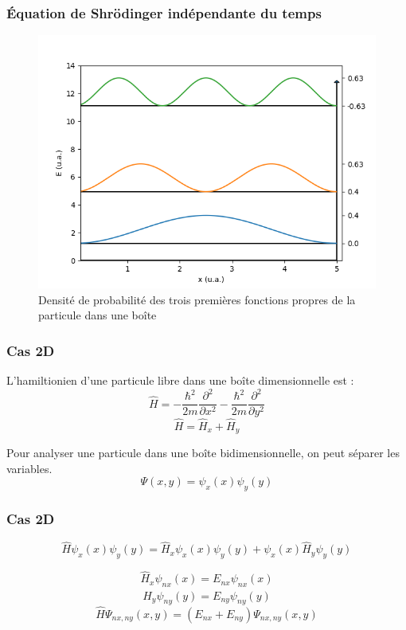 \documentclass[aspectratio=169]{beamer}
\begin{document}
\begin{frame}
\frametitle{Équation de Shrödinger indépendante du temps}
\begin{figure}[h]
\includegraphics[scale=0.5]{den_propre}
\caption{Densité de probabilité des trois premières fonctions propres de la particule dans une boîte}
\end{figure}

\end{frame}



\begin{frame}
\frametitle{Cas 2D}
L'hamiltionien d'une particule libre dans une boîte dimensionnelle est :
\begin{equation}
\hat{H}=-\frac{\hbar^2}{2m}\frac{\partial^2}{\partial x^2}-\frac{\hbar^2}{2m}\frac{\partial^2}{\partial y^2}
\end{equation}
\begin{equation}
\hat{H}=\hat{H}_x+\hat{H}_y
\end{equation}


Pour analyser une particule dans une boîte bidimensionnelle, on peut séparer les variables. 
\begin{equation}
\Psi(x,y)=\psi_x(x)\psi_y(y)
\end{equation}
\end{frame}


\begin{frame}
\frametitle{Cas 2D}
\begin{equation}
\hat{H}\psi_x(x)\psi_y(y)=\hat{H}_x\psi_x(x)\psi_y(y)+\psi_x(x)\hat{H}_y\psi_y(y)
\end{equation}

\begin{equation}
\hat{H}_x\psi_{nx}(x)=E_{nx}\psi_{nx}(x)
\end{equation}
\begin{equation}
\hat{H}_y\psi_{ny}(y)=E_{ny}\psi_{ny}(y)
\end{equation}
\begin{equation}
\hat{H}\Psi_{nx,ny}(x,y)=\left(E_{nx}+E_{ny}\right)\Psi_{nx,ny}(x,y)
\end{equation}
\end{frame}
\end{document}
